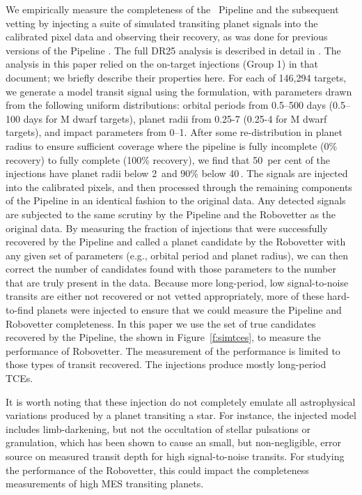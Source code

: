 We empirically measure the completeness of the \Kepler\ Pipeline and the subsequent vetting by injecting a suite of simulated transiting planet signals into the calibrated pixel data and observing their recovery, as was done for previous versions of the \Kepler{} Pipeline \citep{Christiansen2013a,Christiansen2015,Christiansen2016}. The full DR25 analysis is described in detail in \citet{Christiansen2017}. The analysis in this paper relied on the on-target injections (Group 1) in that document; we briefly describe their properties here. For each of 146,294 targets, we generate a model transit signal using the \citet{Mandel2002} formulation, with parameters drawn from the following uniform distributions: orbital periods from 0.5--500 days (0.5--100 days for M dwarf targets), planet radii from 0.25-7 \re{} (0.25-4 \re{} for M dwarf targets), and impact parameters from 0--1. After some re-distribution in planet radius to ensure sufficient coverage where the pipeline is fully incomplete (0\% recovery) to fully complete (100\% recovery), we find that 50~per cent of the injections have planet radii below 2\,\re{} and 90\% below 40\,\re{}. The signals are injected into the calibrated pixels, and then processed through the remaining components of the \Kepler{} Pipeline in an identical fashion to the original data. Any detected signals are subjected to the same scrutiny by the Pipeline and the Robovetter as the original data. By measuring the fraction of injections that were successfully recovered by the Pipeline and called a planet candidate by the Robovetter with any given set of parameters (e.g., orbital period and planet radius), we can then correct the number of candidates found with those parameters to the number that are truly present in the data. Because more long-period, low signal-to-noise transits are either not recovered or not vetted appropriately, more of these hard-to-find planets were injected to ensure that we could measure the Pipeline and Robovetter completeness.  In this paper we use the set of true candidates recovered by the \Kepler{} Pipeline, the  shown in Figure~\ref{f:simtces}, to measure the performance of Robovetter. The measurement of the performance is limited to those types of transit recovered. The injections produce mostly long-period TCEs. 

{\color{blue}It is worth noting that these injection do not completely emulate all astrophysical variations produced by a planet transiting a star.  For instance, the injected model includes limb-darkening, but not the occultation of stellar pulsations or granulation, which has been shown to cause an small, but non-negligible, error source on measured transit depth \citep{Chiavassa2017} for high signal-to-noise transits.  For studying the performance of the Robovetter, this could impact the completeness measurements of high MES transiting planets. }



